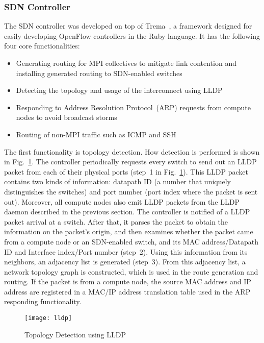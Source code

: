 \subsubsection{SDN Controller}

The SDN controller was developed on top  of Trema~\autocite{trema}, a
framework designed for easily developing OpenFlow controllers in the Ruby
language. It has the following four core functionalities:

\begin{itemize}
\item Generating routing for MPI collectives to mitigate link contention and
    installing generated routing to SDN-enabled switches
\item Detecting the topology and usage of the interconnect using LLDP
\item Responding to Address Resolution Protocol~(ARP) requests from compute
    nodes to avoid broadcast storms
\item Routing of non-MPI traffic such as ICMP and SSH
\end{itemize}

The first functionality is topology detection. How detection is
performed is shown in Fig.~\ref{fig:lldp}. The controller periodically
requests every switch to send out an LLDP packet from each of their physical
ports (step~1 in Fig.~\ref{fig:lldp}). This LLDP packet contains two kinds of
information: datapath ID (a number that uniquely distinguishes the switches)
and port number (port index where the packet is sent out). Moreover, all
compute nodes also emit LLDP packets from the LLDP daemon described in the
previous section. The controller is notified of a LLDP packet arrival at a
switch. After that, it parses the packet to obtain the information on the
packet's origin, and then examines whether the packet came from a compute node
or an SDN-enabled switch, and its MAC address/Datapath ID and Interface
index/Port number (step~2). Using this information from its neighbors, an
adjacency list is generated (step~3). From this adjacency list, a network
topology graph is constructed, which is used in the route generation and
routing. If the packet is from a compute node, the source MAC address and IP
address are registered in a MAC/IP address translation table used in the ARP
responding functionality.

\begin{figure}
    \centering
    \texttt{[image: lldp]}
    \caption{Topology Detection using LLDP}%
    \label{fig:lldp}
\end{figure}

